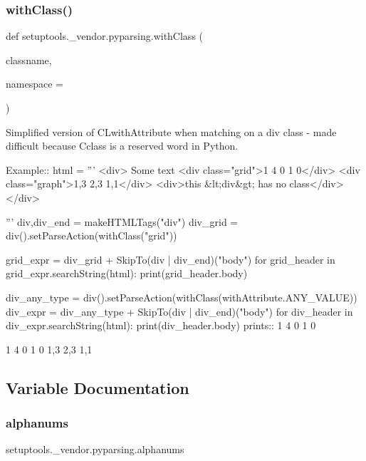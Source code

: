 \subsubsection{\texorpdfstring{with\+Class()}{withClass()}}
{\footnotesize\ttfamily def setuptools.\+\_\+vendor.\+pyparsing.\+with\+Class (\begin{DoxyParamCaption}\item[{}]{classname,  }\item[{}]{namespace = {\ttfamily \textquotesingle{}\textquotesingle{}} }\end{DoxyParamCaption})}

\begin{DoxyVerb}Simplified version of C{L{withAttribute}} when matching on a div class - made
difficult because C{class} is a reserved word in Python.

Example::
    html = '''
        <div>
        Some text
        <div class="grid">1 4 0 1 0</div>
        <div class="graph">1,3 2,3 1,1</div>
        <div>this &lt;div&gt; has no class</div>
        </div>
            
    '''
    div,div_end = makeHTMLTags("div")
    div_grid = div().setParseAction(withClass("grid"))
    
    grid_expr = div_grid + SkipTo(div | div_end)("body")
    for grid_header in grid_expr.searchString(html):
        print(grid_header.body)
    
    div_any_type = div().setParseAction(withClass(withAttribute.ANY_VALUE))
    div_expr = div_any_type + SkipTo(div | div_end)("body")
    for div_header in div_expr.searchString(html):
        print(div_header.body)
prints::
    1 4 0 1 0

    1 4 0 1 0
    1,3 2,3 1,1
\end{DoxyVerb}
 

\subsection{Variable Documentation}
\mbox{\label{namespacesetuptools_1_1__vendor_1_1pyparsing_a3192e8a9c17478d5ae98a8f842beb650}} 
\subsubsection{\texorpdfstring{alphanums}{alphanums}}
{\footnotesize\ttfamily setuptools.\+\_\+vendor.\+pyparsing.\+alphanums}

